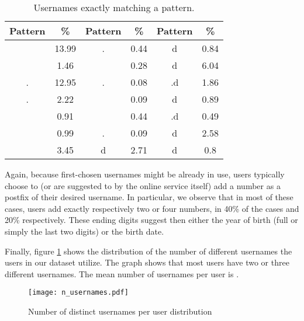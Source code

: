 \documentclass[letterpaper]{sig-alternate}
\begin{document}
\begin{table} [ht!]
  \centering
      \scriptsize
      \begin{tabular}{|c|c||c|c||c|c|}
        \hline
        Pattern & \% & Pattern & \% & Pattern & \% \\
        \hline
        \hline
        &  13.99 &  . &  0.44  &  d   &  0.84\\
        \hline
        &  1.46  &    &  0.28  &  d &  6.04\\
        \hline
      . &  12.95 &  . &  0.08  &  .d   &  1.86\\
        \hline
      . &  2.22  &    &  0.09  &  d &  0.89\\
        \hline
       &  0.91  &    &  0.44  &  .d   &  0.49\\
        \hline
       &  0.99  &  . &  0.09  &  d &  2.58\\
        \hline
        &  3.45  &  d   &  2.71  &  d &  0.8\\
      \hline
      \end{tabular}
  \caption{Usernames exactly matching a pattern.}
 \label{tab:nbu_exact_match}
\end{table}







Again, because first-chosen usernames might be already in use, users typically
choose to (or are suggested to by the online service itself) add a number as a
postfix of their desired username. In particular, we observe that in most of
these cases, users add exactly respectively two or four numbers, in 40\% of
the cases and 20\% respectively. These ending digits suggest then either the
year of birth (full or simply the last two digits) or the birth date. 












Finally, figure \ref{fig:n_usernames} shows the distribution of the number of different usernames
the users in our dataset utilize. The graph shows that most users have two or three different usernames.
The mean number of usernames per user is . 

\begin{figure} [tb] \centering
\texttt{[image: n\_usernames.pdf]}
\caption{Number of distinct usernames per user distribution}
\label{fig:n_usernames}
\end{figure}
\end{document}

